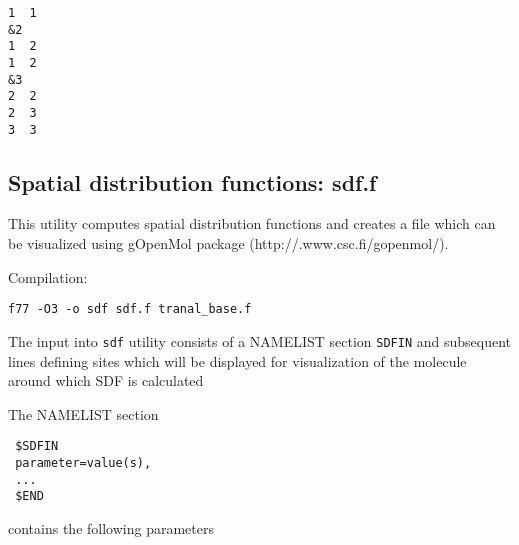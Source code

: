 \documentclass{article}
\begin{document}
\begin{verbatim}
1  1
&2
1  2
1  2
&3
2  2
2  3
3  3
\end{verbatim}

\subsection{Spatial distribution functions: sdf.f}

This utility computes spatial distribution functions and creates a file
which can be visualized using gOpenMol package (http://.www.csc.fi/gopenmol/).

Compilation:

\verb|f77 -O3 -o sdf sdf.f tranal_base.f|

The input into \verb|sdf| utility consists of a NAMELIST section
\verb|SDFIN| and subsequent lines defining sites which will be displayed
for visualization of the molecule around which SDF is calculated

The NAMELIST section

\begin{verbatim}
 $SDFIN
 parameter=value(s),
 ...
 $END
\end{verbatim}

contains the following parameters
\end{document}
